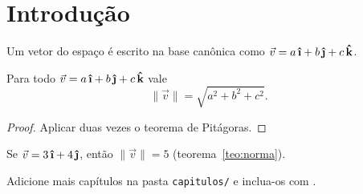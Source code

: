 \chapter{Introdução}
\label{cap:introducao}

\begin{definicao}
  Um vetor do espaço é escrito na base canônica como
  $\vec{v} = a\,\ihat + b\,\jhat + c\,\khat$.
\end{definicao}

\begin{teorema}
  \label{teo:norma}
  Para todo $\vec{v} = a\,\ihat + b\,\jhat + c\,\khat$ vale
  \[
    \lVert \vec{v} \rVert = \sqrt{a^2 + b^2 + c^2}.
  \]
\end{teorema}

\begin{proof}
  Aplicar duas vezes o teorema de Pitágoras.
\end{proof}

\begin{exemplo}
  Se $\vec{v} = 3\,\ihat + 4\,\jhat$, então $\lVert \vec{v} \rVert = 5$
  (teorema~\ref{teo:norma}).
\end{exemplo}

\begin{observacao}
  Adicione mais capítulos na pasta \texttt{capitulos/} e inclua-os com \verb||.
\end{observacao}
